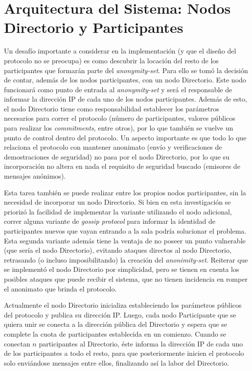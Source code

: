 \section{Arquitectura del Sistema: Nodos Directorio y Participantes}

Un desafío importante a considerar en la implementación (y que el diseño del 
protocolo no se preocupa) es como descubrir la locación del resto de los 
participantes que formarán parte del \emph{anonymity-set}. Para ello se tomó 
la decisión de contar, además de los nodos participantes, con un nodo 
Directorio. Este nodo funcionará como punto de entrada al \emph{anonymity-set} 
y será el responsable de informar la dirección IP de cada uno de los nodos 
participantes. Además de esto, el nodo Directorio tiene como responsabilidad 
establecer los parámetros necesarios para correr el protocolo (número de 
participantes, valores públicos para realizar los \emph{commitments}, entre 
otros), por lo que también se vuelve un punto de control dentro del protocolo. 
Un aspecto importante es que todo lo que relaciona el protocolo con mantener 
anonimato (envío y verificaciones de demostraciones de seguridad) no pasa por 
el nodo Directorio, por lo que su incorporación no altera en nada el requisito 
de seguridad buscado (emisores de mensajes anónimos).

Esta tarea también se puede realizar entre los propios nodos participantes, 
sin la necesidad de incorporar un nodo Directorio. Si bien en esta 
investigación se priorizó la facilidad de implementar la variante utilizando 
el nodo adicional, correr alguna variante de \emph{gossip protocol} para 
informar la identidad de participantes nuevos que vayan entrando a la sala 
podría solucionar el problema. Esta segunda variante además tiene la ventaja 
de no poseer un punto vulnerable (que sería el nodo Directorio), evitando 
ataques directos al nodo Directorio, retrasando (o incluso imposibilitando) la 
creación del \emph{anonimity-set}. Reiterar que se implementó el nodo 
Directorio por simplicidad, pero se tienen en cuenta los posibles ataques que 
puede recibir el sistema, que no tienen incidencia en romper el anonimato que 
brinda el protocolo.

Actualmente el nodo Directorio inicializa estableciendo los parámetros 
públicos del protocolo y publica su dirección IP. Luego, cada nodo 
Participante que se quiera unir se conecta a la dirección pública del 
Directorio y espera que se complete la cuota de participantes establecida en 
un comienzo. Cuando se conectan $n$ participantes al Directorio, éste informa 
la dirección IP de cada uno de los participantes a todo el resto, para que 
posteriormente inicien el protocolo solo enviándose mensajes entre ellos, 
finalizando así la labor del Directorio.

